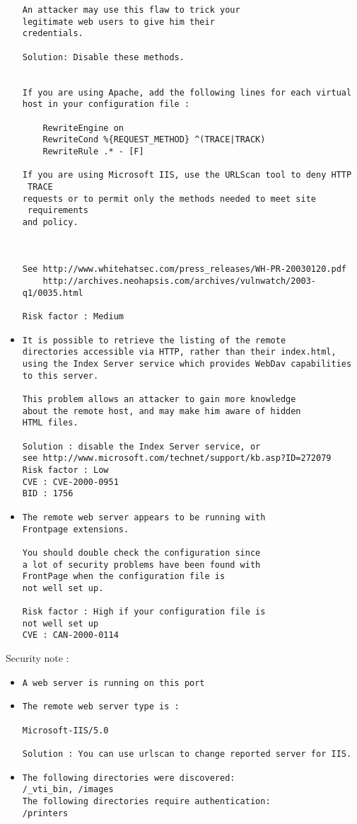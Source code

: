 \documentclass{article}
\begin{document}
\begin{itemize}
\begin{verbatim}
An attacker may use this flaw to trick your
legitimate web users to give him their 
credentials.

Solution: Disable these methods.


If you are using Apache, add the following lines for each virtual
host in your configuration file :

    RewriteEngine on
    RewriteCond %{REQUEST_METHOD} ^(TRACE|TRACK)
    RewriteRule .* - [F]

If you are using Microsoft IIS, use the URLScan tool to deny HTTP
 TRACE
requests or to permit only the methods needed to meet site
 requirements
and policy.



See http://www.whitehatsec.com/press_releases/WH-PR-20030120.pdf
    http://archives.neohapsis.com/archives/vulnwatch/2003-q1/0035.html

Risk factor : Medium
\end{verbatim}\item \begin{verbatim}
It is possible to retrieve the listing of the remote 
directories accessible via HTTP, rather than their index.html, 
using the Index Server service which provides WebDav capabilities
to this server.

This problem allows an attacker to gain more knowledge
about the remote host, and may make him aware of hidden
HTML files.

Solution : disable the Index Server service, or
see http://www.microsoft.com/technet/support/kb.asp?ID=272079
Risk factor : Low
CVE : CVE-2000-0951
BID : 1756
\end{verbatim}\item \begin{verbatim}
The remote web server appears to be running with
Frontpage extensions. 

You should double check the configuration since
a lot of security problems have been found with
FrontPage when the configuration file is
not well set up.

Risk factor : High if your configuration file is
not well set up
CVE : CAN-2000-0114
\end{verbatim}\end{itemize}
Security note :\\
\begin{itemize}
\item \begin{verbatim}
A web server is running on this port
\end{verbatim}\item \begin{verbatim}
The remote web server type is :

Microsoft-IIS/5.0

Solution : You can use urlscan to change reported server for IIS.
\end{verbatim}\item \begin{verbatim}
The following directories were discovered:
/_vti_bin, /images
The following directories require authentication:
/printers
\end{verbatim}\end{itemize}
\end{document}
